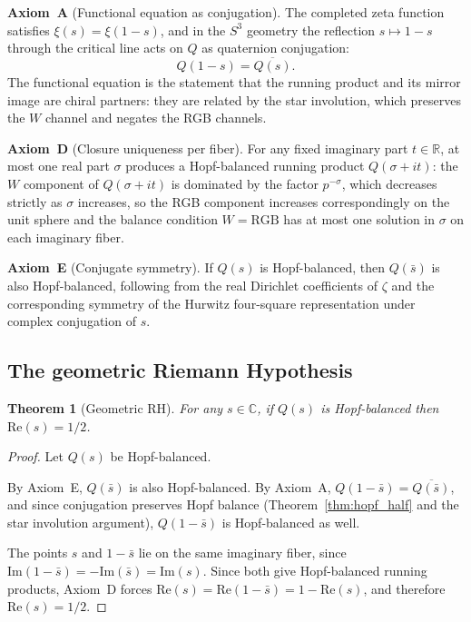 \documentclass[12pt,a4paper]{article}
\newtheorem{theorem}{Theorem}[section]
\theoremstyle{definition}
\theoremstyle{remark}
\begin{document}
\medskip
\textbf{Axiom~A} (Functional equation as conjugation). The completed zeta
function satisfies $\xi(s) = \xi(1-s)$, and in the $S^3$ geometry the
reflection $s \mapsto 1-s$ through the critical line acts on $Q$ as quaternion
conjugation:
\[
  Q(1-s) = \overline{Q(s)}.
\]
The functional equation is the statement that the running product and its mirror
image are chiral partners: they are related by the star involution, which
preserves the $W$ channel and negates the RGB channels.

\medskip
\textbf{Axiom~D} (Closure uniqueness per fiber). For any fixed imaginary part
$t \in \mathbb{R}$, at most one real part $\sigma$ produces a Hopf-balanced
running product $Q(\sigma+it)$: the $W$ component of $Q(\sigma+it)$ is
dominated by the factor $p^{-\sigma}$, which decreases strictly as $\sigma$
increases, so the RGB component increases correspondingly on the unit sphere
and the balance condition $W = \mathrm{RGB}$ has at most one solution in
$\sigma$ on each imaginary fiber.

\medskip
\textbf{Axiom~E} (Conjugate symmetry). If $Q(s)$ is Hopf-balanced, then
$Q(\bar{s})$ is also Hopf-balanced, following from the real Dirichlet
coefficients of $\zeta$ and the corresponding symmetry of the Hurwitz
four-square representation under complex conjugation of $s$.

\subsection{The geometric Riemann Hypothesis}

\begin{theorem}[Geometric RH]\label{thm:geom_rh}
For any $s \in \mathbb{C}$, if $Q(s)$ is Hopf-balanced then $\mathrm{Re}(s) = 1/2$.
\end{theorem}

\begin{proof}
Let $Q(s)$ be Hopf-balanced.

By Axiom~E, $Q(\bar{s})$ is also Hopf-balanced. By Axiom~A,
$Q(1-\bar{s}) = \overline{Q(\bar{s})}$, and since conjugation preserves
Hopf balance (Theorem~\ref{thm:hopf_half} and the star involution argument),
$Q(1-\bar{s})$ is Hopf-balanced as well.

The points $s$ and $1-\bar{s}$ lie on the same imaginary fiber, since
$\mathrm{Im}(1-\bar{s}) = -\mathrm{Im}(\bar{s}) = \mathrm{Im}(s)$.
Since both give Hopf-balanced running products, Axiom~D forces
$\mathrm{Re}(s) = \mathrm{Re}(1-\bar{s}) = 1 - \mathrm{Re}(s)$,
and therefore $\mathrm{Re}(s) = 1/2$.
\end{proof}
\end{document}
